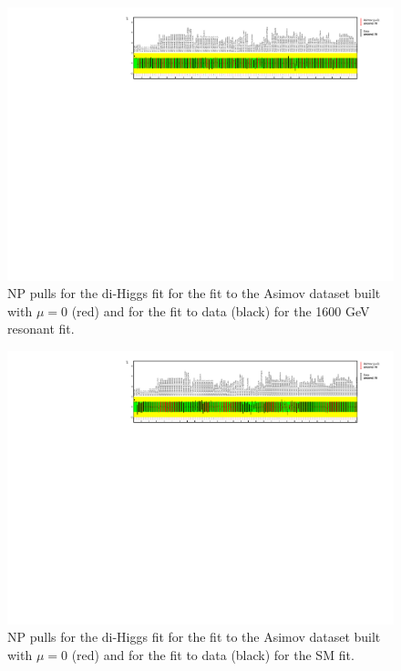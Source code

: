 \begin{figure}
\centering
\includegraphics[angle=270]{figures/results/HH/LepHad/NP_allExceptGammas_2HDM1600.pdf}
\caption{NP pulls for the di-Higgs \lephad fit for the fit to the Asimov dataset built with $\mu=0$ (red) and for the fit to data (black) for the 1600 GeV resonant fit.}
\label{fig:LepHadPostfitNPPulls2HDM1600}
\end{figure}

\begin{figure}
\centering
\includegraphics[angle=270]{figures/results/HH/LepHad/NP_allExceptGammas_SM.pdf}
\caption{NP pulls for the di-Higgs \lephad fit for the fit to the Asimov dataset built with $\mu=0$ (red) and for the fit to data (black) for the SM fit.}
\label{fig:LepHadPostfitNPPullsSM}
\end{figure}


